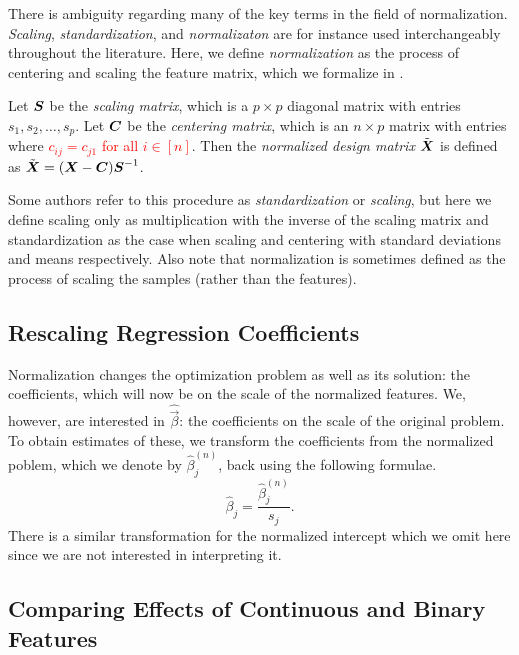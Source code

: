 There is ambiguity regarding many of the key terms in the field of normalization. \emph{Scaling}, \emph{standardization}, and \emph{normalizaton} are for instance used interchangeably throughout the literature. Here, we define \emph{normalization} as the process of centering and scaling the feature matrix, which we formalize in .

\begin{definition}[Normalization]
  \label{def:normalization}
  Let \(\boldsymbol S\) be the \emph{scaling matrix}, which is a \(p \times p\) diagonal matrix with entries \(s_1, s_2, \dots, s_p\). Let \(\boldsymbol C\) be the \emph{centering matrix}, which is an \(n \times p\) matrix with entries where \textcolor{red}{\(c_{ij} = c_{j1}\) for all \(i \in [n]\)}. Then the \emph{normalized design matrix} \(\tilde{\boldsymbol X}\) is defined as \(\tilde{\boldsymbol X} = (\boldsymbol X - \boldsymbol C)\boldsymbol S^{-1}\).
\end{definition}

Some authors refer to this procedure as \emph{standardization} or \emph{scaling}, but here we define scaling only as multiplication with the inverse of the scaling matrix and standardization as the case when scaling and centering with standard deviations and means respectively. Also note that normalization is sometimes defined as the process of scaling the samples (rather than the features).

\subsection{Rescaling Regression Coefficients}

Normalization changes the optimization problem as well as its solution: the coefficients, which will now be on the scale of the normalized features. We, however, are interested in \(\hat{\vec{\beta}}\): the coefficients on the scale of the original problem. To obtain estimates of these, we transform the coefficients from the normalized poblem, which we denote by \(\hat\beta^{(n)}_j\), back using the following formulae.
\[
  \hat\beta_j = \frac{\hat\beta^{(n)}_j}{s_j}.
\]
There is a similar transformation for the normalized intercept which we omit here since we are not interested in interpreting it.

\subsection{Comparing Effects of Continuous and Binary Features}

